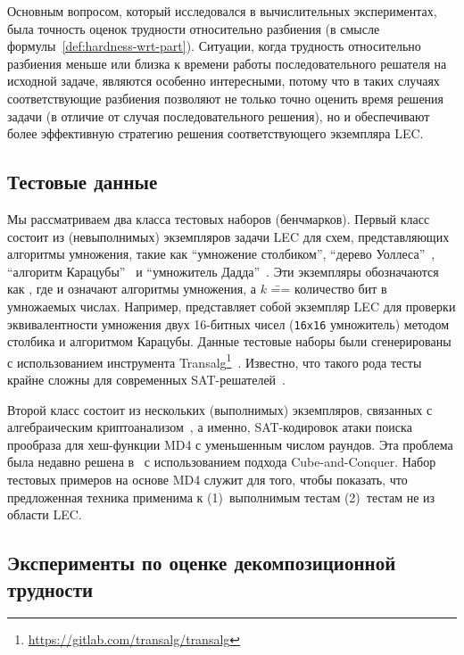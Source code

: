 Основным вопросом, который исследовался в вычислительных экспериментах, была точность оценок трудности относительно разбиения (в смысле формулы~\eqref{def:hardness-wrt-part}).
Ситуации, когда трудность относительно разбиения меньше или близка к времени работы последовательного решателя на исходной задаче, являются особенно интересными, потому что в таких случаях соответствующие разбиения позволяют не только точно оценить время решения задачи (в отличие от случая последовательного решения), но и обеспечивают более эффективную стратегию решения соответствующего экземпляра LEC.



\subsection{Тестовые данные}
\label{sub:partitioning-experiments-benchmarks}

Мы рассматриваем два класса тестовых наборов (бенчмарков).
Первый класс состоит из (невыполнимых) экземпляров задачи LEC для схем, представляющих алгоритмы умножения, такие как
\enquote{умножение столбиком}, \enquote{дерево Уоллеса}~\cite{cormen1990}, \enquote{алгоритм Карацубы}~\cite{knuth-vol2} и \enquote{умножитель Дадда}~\cite{dadda1965}.
Эти экземпляры обозначаются как , где  и  означают алгоритмы умножения, а $k$ \=== количество бит в умножаемых числах.
Например,  представляет собой экземпляр LEC для проверки эквивалентности умножения двух 16-битных чисел (\texttt{16x16} умножитель) методом столбика и алгоритмом Карацубы.
Данные тестовые наборы были сгенерированы с использованием инструмента Transalg\footnote{\url{https://gitlab.com/transalg/transalg}}~\cite{semenov2020}.
Известно, что такого рода тесты крайне сложны для современных SAT-решателей~\cite{kaufmann2019,semenov2021}.

Второй класс состоит из нескольких (выполнимых) экземпляров, связанных с алгебраическим криптоанализом~\cite{bard2009}, а именно, SAT-кодировок атаки поиска прообраза для хеш-функции MD4 с уменьшенным числом раундов.
Эта проблема была недавно решена в~\cite{zaikin2022} с использованием подхода Cube-and-Conquer.
Набор тестовых примеров на основе MD4 служит для того, чтобы показать, что предложенная техника применима к (1)~выполнимым тестам (2)~тестам не из области LEC.


\subsection{Эксперименты по оценке декомпозиционной трудности}
\label{sub:partitioning-experiments-dhardness}

